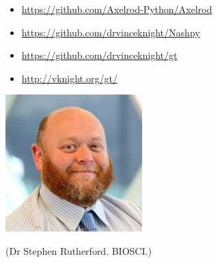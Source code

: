 \documentclass{beamer}
\begin{document}
    \begin{frame}
        \begin{itemize}
            \item \url{https://github.com/Axelrod-Python/Axelrod}
            \item \url{https://github.com/drvinceknight/Nashpy}
            \item \url{https://github.com/drvinceknight/gt}
            \item \url{http://vknight.org/gt/}
        \end{itemize}
    \end{frame}

    \begin{frame}
        \begin{center}
            \includegraphics[width=.5\textwidth]{./static/Rutherford_Stephen_staff_profile.jpg}

            (Dr Stephen Rutherford. BIOSCI.)
        \end{center}
    \end{frame}
\end{document}
